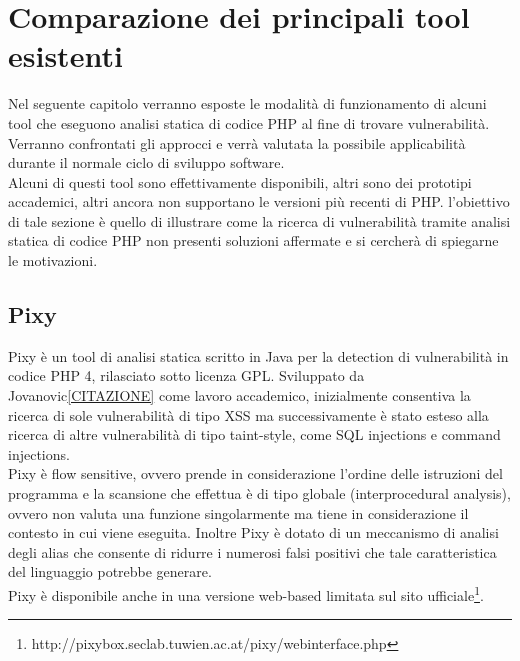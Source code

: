 \chapter{Comparazione dei principali tool esistenti}
Nel seguente capitolo verranno esposte le modalità di funzionamento di alcuni tool che eseguono analisi statica di codice PHP al fine di trovare vulnerabilità. Verranno confrontati gli approcci e verrà valutata la possibile applicabilità durante il normale ciclo di sviluppo software. \\
Alcuni di questi tool sono effettivamente disponibili, altri sono dei prototipi accademici, altri ancora non supportano le versioni più recenti di PHP. l'obiettivo di tale sezione è quello di illustrare come la ricerca di vulnerabilità tramite analisi statica di codice PHP non presenti soluzioni affermate e si cercherà di spiegarne le motivazioni.

\section{Pixy}
Pixy è un tool di analisi statica scritto in Java per la detection di vulnerabilità in codice PHP 4, rilasciato sotto licenza GPL. Sviluppato da Jovanovic\ref{CITAZIONE} come lavoro accademico, inizialmente consentiva la ricerca di sole vulnerabilità di tipo XSS ma successivamente è stato esteso alla ricerca di altre vulnerabilità di tipo taint-style, come SQL injections e command injections.\\
Pixy è flow sensitive, ovvero prende in considerazione l'ordine delle istruzioni del programma e la scansione che effettua è di tipo globale (interprocedural analysis), ovvero non valuta una funzione singolarmente ma tiene in considerazione il contesto in cui viene eseguita. Inoltre Pixy è dotato di un meccanismo di analisi degli alias che consente di ridurre i numerosi falsi positivi che tale caratteristica del linguaggio potrebbe generare.\\
Pixy è disponibile anche in una versione web-based limitata sul sito ufficiale\footnote{http://pixybox.seclab.tuwien.ac.at/pixy/webinterface.php}.

